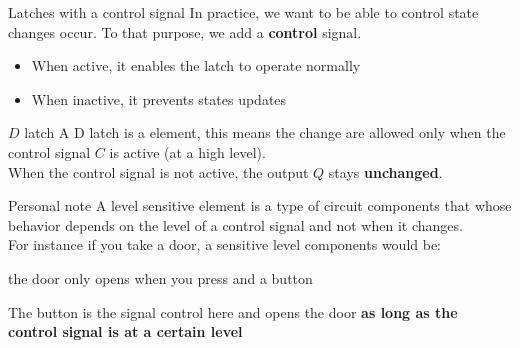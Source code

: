     \begin{parag}{Latches with a control signal}
        In practice, we want to  be able to control  state changes occur. To that purpose, we add a \textbf{control} signal.
        \begin{itemize}
            \item When active, it enables the latch to operate normally
            \item When inactive, it prevents states updates
        \end{itemize}
        
    \end{parag}
    \begin{parag}{$D$ latch}
        A D latch is a  element, this means the change are allowed only when the control signal $C$ is active (at a high level).\\
        When the control signal is not active, the output $Q$ stays \textbf{unchanged}.\\
        \begin{subparag}{Personal note}
            A level sensitive element is a type of circuit components that whose behavior depends on the level of a control signal and not when it changes.\\
            For instance if you take a door, a sensitive level components would be:
            \begin{center}
                the door only opens when you press and  a button
            \end{center}
            The button is the signal control here and opens the door \textbf{as long as the control signal is at a certain level}
           

\end{subparag}
\end{parag}
